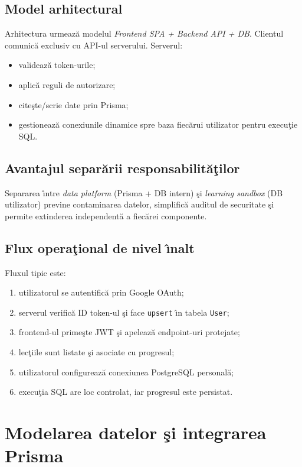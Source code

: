 \documentclass[12pt,onecolumn,draftclsnofoot]{IEEEtran}
\begin{document}
\subsection{Model arhitectural}
Arhitectura urmeaz\u{a} modelul \emph{Frontend SPA + Backend API + DB}. Clientul comunic\u{a} exclusiv cu API-ul serverului. Serverul:
\begin{itemize}
  \item valideaz\u{a} token-urile;
  \item aplic\u{a} reguli de autorizare;
  \item cite\c{s}te/scrie date prin Prisma;
  \item gestioneaz\u{a} conexiunile dinamice spre baza fiec\u{a}rui utilizator pentru execu\c{t}ie SQL.
\end{itemize}

\subsection{Avantajul separ\u{a}rii responsabilit\u{a}\c{t}ilor}
Separarea \^{\i}ntre \emph{data platform} (Prisma + DB intern) \c{s}i \emph{learning sandbox} (DB utilizator) previne contaminarea datelor, simplific\u{a} auditul de securitate \c{s}i permite extinderea independent\u{a} a fiec\u{a}rei componente.

\subsection{Flux opera\c{t}ional de nivel \^{\i}nalt}
Fluxul tipic este:
\begin{enumerate}[label=\arabic*)]
  \item utilizatorul se autentific\u{a} prin Google OAuth;
  \item serverul verific\u{a} ID token-ul \c{s}i face \texttt{upsert} \^{\i}n tabela \texttt{User};
  \item frontend-ul prime\c{s}te JWT \c{s}i apeleaz\u{a} endpoint-uri protejate;
  \item lec\c{t}iile sunt listate \c{s}i asociate cu progresul;
  \item utilizatorul configureaz\u{a} conexiunea PostgreSQL personal\u{a};
  \item execu\c{t}ia SQL are loc controlat, iar progresul este persistat.
\end{enumerate}

\newpage
\section{Modelarea datelor \c{s}i integrarea Prisma}
\end{document}
